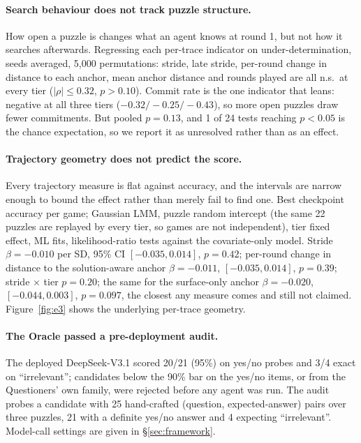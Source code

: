 \documentclass{article}
\begin{document}
\paragraph{Search behaviour does not track puzzle structure.} How open a
puzzle is changes what an agent knows at round 1, but not how it searches
afterwards. Regressing each
per-trace indicator on under-determination, seeds averaged, 5{,}000
permutations: stride, late stride, per-round change in distance to each
anchor, mean anchor distance and rounds played are all n.s.\ at every tier ($|\rho| \leq 0.32$, $p > 0.10$).
Commit rate is the one indicator that leans: negative at all three tiers
($-0.32 / -0.25 / -0.43$), so more open puzzles draw fewer commitments. But
pooled $p = 0.13$, and 1 of 24 tests reaching $p < 0.05$ is the chance
expectation, so we report it as unresolved rather than as an effect.

\paragraph{Trajectory geometry does not predict the score.} Every trajectory
measure is flat against accuracy, and the intervals are narrow enough to bound
the effect rather than merely fail to find one. Best checkpoint accuracy per
game; Gaussian LMM, puzzle random intercept (the same 22 puzzles are replayed
by every tier, so games are not independent), tier fixed effect, ML fits,
likelihood-ratio tests against the covariate-only model. Stride
$\beta = -0.010$ per SD, 95\% CI $[-0.035, 0.014]$, $p = 0.42$; per-round
change in distance to the solution-aware anchor $\beta = -0.011$,
$[-0.035, 0.014]$, $p = 0.39$; stride $\times$ tier $p = 0.20$; the same for
the surface-only anchor $\beta = -0.020$, $[-0.044, 0.003]$, $p = 0.097$, the
closest any measure comes and still not claimed. Figure~\ref{fig:e3} shows the underlying per-trace geometry.

\paragraph{The Oracle passed a pre-deployment audit.} The deployed
DeepSeek-V3.1 scored 20/21 (95\%) on yes/no probes and 3/4 exact on
``irrelevant''; candidates below the 90\% bar on the yes/no items, or from the
Questioners' own family, were rejected before any agent was run. The audit
probes a candidate with 25 hand-crafted (question, expected-answer) pairs over
three puzzles, 21 with a definite yes/no answer and 4 expecting ``irrelevant''.
Model-call settings are given in \S\ref{sec:framework}.
\end{document}
